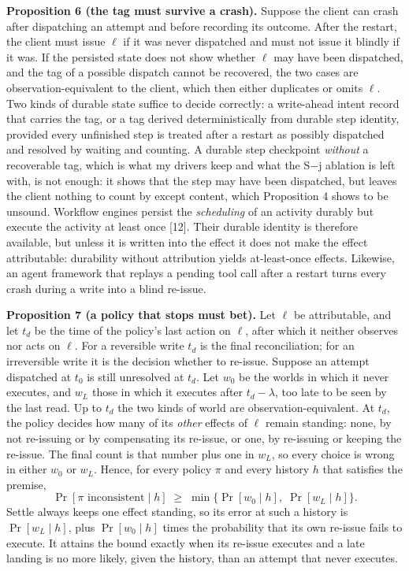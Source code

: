 \documentclass[
  10pt,
]{article}
\begin{document}
\textbf{Proposition 6 (the tag must survive a crash).} Suppose the
client can crash after dispatching an attempt and before recording its
outcome. After the restart, the client must issue \(\ell\) if it was
never dispatched and must not issue it blindly if it was. If the
persisted state does not show whether \(\ell\) may have been dispatched,
and the tag of a possible dispatch cannot be recovered, the two cases
are observation-equivalent to the client, which then either duplicates
or omits \(\ell\). Two kinds of durable state suffice to decide
correctly: a write-ahead intent record that carries the tag, or a tag
derived deterministically from durable step identity, provided every
unfinished step is treated after a restart as possibly dispatched and
resolved by waiting and counting. A durable step checkpoint
\emph{without} a recoverable tag, which is what my drivers keep and what
the S−j ablation is left with, is not enough: it shows that the step may
have been dispatched, but leaves the client nothing to count by except
content, which Proposition 4 shows to be unsound. Workflow engines
persist the \emph{scheduling} of an activity durably but execute the
activity at least once {[}12{]}. Their durable identity is therefore
available, but unless it is written into the effect it does not make the
effect attributable: durability without attribution yields at-least-once
effects. Likewise, an agent framework that replays a pending tool call
after a restart turns every crash during a write into a blind re-issue.

\textbf{Proposition 7 (a policy that stops must bet).} Let \(\ell\) be
attributable, and let \(t_d\) be the time of the policy's last action on
\(\ell\), after which it neither observes nor acts on \(\ell\). For a
reversible write \(t_d\) is the final reconciliation; for an
irreversible write it is the decision whether to re-issue. Suppose an
attempt dispatched at \(t_0\) is still unresolved at \(t_d\). Let
\(w_0\) be the worlds in which it never executes, and \(w_L\) those in
which it executes after \(t_d - \lambda\), too late to be seen by the
last read. Up to \(t_d\) the two kinds of world are
observation-equivalent. At \(t_d\), the policy decides how many of its
\emph{other} effects of \(\ell\) remain standing: none, by not
re-issuing or by compensating its re-issue, or one, by re-issuing or
keeping the re-issue. The final count is that number plus one in
\(w_L\), so every choice is wrong in either \(w_0\) or \(w_L\). Hence,
for every policy \(\pi\) and every history \(h\) that satisfies the
premise,
\[\Pr[\pi \text{ inconsistent} \mid h] \;\ge\; \min\{\Pr[w_0 \mid h],\; \Pr[w_L \mid h]\}.\]
Settle always keeps one effect standing, so its error at such a history
is \(\Pr[w_L \mid h]\), plus \(\Pr[w_0 \mid h]\) times the probability
that its own re-issue fails to execute. It attains the bound exactly
when its re-issue executes and a late landing is no more likely, given
the history, than an attempt that never executes.
\end{document}
